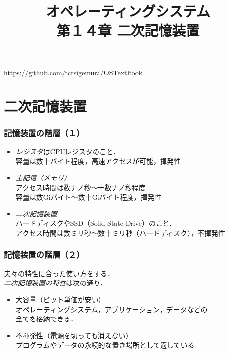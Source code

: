 \documentclass{beamer}                   %
\begin{document}
\title[２次記憶]{オペレーティングシステム\\第１４章 二次記憶装置}
\date{}
\begin{frame}
  \titlepage
  \centerline{\url{https://github.com/tctsigemura/OSTextBook}}
\end{frame}


\section{二次記憶装置}
\begin{frame}
  \frametitle{記憶装置の階層（１）}
  \begin{itemize}
  \item \emph{レジスタ}はCPUレジスタのこと．\\
    容量は数十バイト程度，高速アクセスが可能，揮発性
  \item \emph{主記憶（メモリ）} \\
    アクセス時間は数ナノ秒〜十数ナノ秒程度\\
    容量は数Giバイト〜数十Giバイト程度，揮発性
  \item \emph{二次記憶装置} \\
    ハードディスクやSSD（Solid State Drive）のこと．\\
    アクセス時間は数ミリ秒〜数十ミリ秒（ハードディスク），不揮発性
\end{itemize}
\end{frame}

\begin{frame}
  \frametitle{記憶装置の階層（２）}
  夫々の特性に合った使い方をする．\\
  \emph{二次記憶装置の特性}は次の通り．
  \begin{itemize}
  \item 大容量（ビット単価が安い）\\
    オペレーティングシステム，アプリケーション，データなどの\\
    全てを格納できる．
  \item 不揮発性（電源を切っても消えない） \\
    プログラムやデータの永続的な置き場所として適している．
  \end{itemize}
  \vfill
\end{frame}
\end{document}
